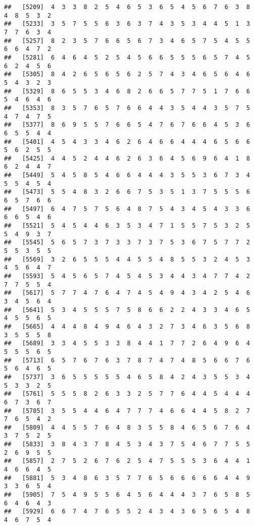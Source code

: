 \documentclass[
]{book}
\begin{document}
\begin{verbatim}
##   [5209]  4  3  3  8  2  5  4  6  5  3  6  5  4  5  6  7  6  3  8  4  8  5  3  2
##   [5233]  3  5  7  5  5  6  3  6  3  7  4  3  5  3  4  4  5  1  3  7  7  6  3  4
##   [5257]  8  2  3  5  7  6  6  5  6  7  3  4  6  5  7  5  4  5  5  6  6  4  7  2
##   [5281]  6  4  6  4  5  2  5  4  5  6  6  5  5  5  6  5  7  4  5  6  2  4  5  6
##   [5305]  8  4  2  6  5  6  5  6  2  5  7  4  3  4  6  5  6  4  6  5  4  3  2  3
##   [5329]  8  6  5  5  3  4  6  8  2  6  6  5  7  7  5  1  7  6  6  5  4  6  4  6
##   [5353]  8  3  5  7  6  5  7  6  6  4  4  3  5  4  4  3  5  7  5  4  7  4  7  5
##   [5377]  8  6  9  5  5  7  6  6  5  4  7  6  7  6  6  4  5  3  6  6  5  5  4  4
##   [5401]  4  5  4  3  3  4  6  2  6  4  6  6  4  4  4  6  5  6  6  5  6  2  5  5
##   [5425]  4  4  5  2  4  4  6  2  6  3  6  4  5  6  9  6  4  1  8  6  2  4  4  7
##   [5449]  5  4  5  8  5  4  6  6  4  4  4  3  5  5  3  6  7  3  4  5  5  4  5  4
##   [5473]  5  5  4  8  3  2  6  6  7  5  3  5  1  3  7  5  5  5  6  6  5  7  6  6
##   [5497]  6  4  7  5  7  5  6  4  8  7  5  4  3  4  5  4  3  3  6  6  6  5  4  6
##   [5521]  5  4  5  4  4  6  3  5  3  4  7  1  5  5  7  5  3  2  5  5  4  9  3  7
##   [5545]  5  6  5  7  3  7  3  3  7  3  7  5  3  6  7  5  7  7  2  5  5  3  5  5
##   [5569]  3  2  6  5  5  5  4  4  5  5  4  8  5  5  3  2  4  5  3  4  5  6  4  7
##   [5593]  5  4  5  6  5  7  4  5  4  5  3  4  4  3  4  7  7  4  2  7  7  5  5  4
##   [5617]  5  7  7  4  7  6  4  7  4  5  4  9  4  3  4  2  5  4  6  3  4  5  6  4
##   [5641]  5  3  4  5  5  5  7  5  8  6  6  2  2  4  3  3  4  6  5  4  5  5  6  5
##   [5665]  4  4  4  8  4  9  4  6  4  3  2  7  3  4  6  3  5  6  8  3  5  5  5  8
##   [5689]  3  3  4  5  5  3  3  8  4  4  1  7  7  2  6  4  9  6  4  5  5  5  6  5
##   [5713]  6  5  7  6  7  6  3  7  8  7  4  7  4  8  5  6  6  7  6  5  6  4  6  5
##   [5737]  3  6  5  5  5  5  5  4  6  5  8  4  2  4  3  5  5  3  4  5  3  3  2  5
##   [5761]  5  5  5  8  2  6  3  3  2  5  7  7  6  4  4  5  4  4  4  6  7  3  6  7
##   [5785]  3  5  5  4  4  6  4  7  7  7  4  6  6  4  4  5  8  2  7  7  6  5  4  2
##   [5809]  4  4  5  5  7  6  4  8  3  5  5  8  4  6  5  6  7  6  4  3  7  5  2  5
##   [5833]  3  8  4  3  7  8  4  5  3  4  3  7  5  4  6  7  7  5  5  2  6  9  5  5
##   [5857]  2  7  5  2  6  7  6  2  5  4  7  5  5  5  3  6  4  4  1  4  6  6  4  5
##   [5881]  5  3  4  8  6  3  5  7  7  6  5  6  6  6  6  6  4  4  9  3  3  6  5  4
##   [5905]  7  5  4  9  5  5  6  4  5  6  4  4  4  3  7  6  5  8  5  6  4  6  4  3
##   [5929]  6  6  7  4  7  6  5  5  2  4  3  4  3  6  5  6  5  4  8  4  6  7  5  4

\end{verbatim}
\end{document}
